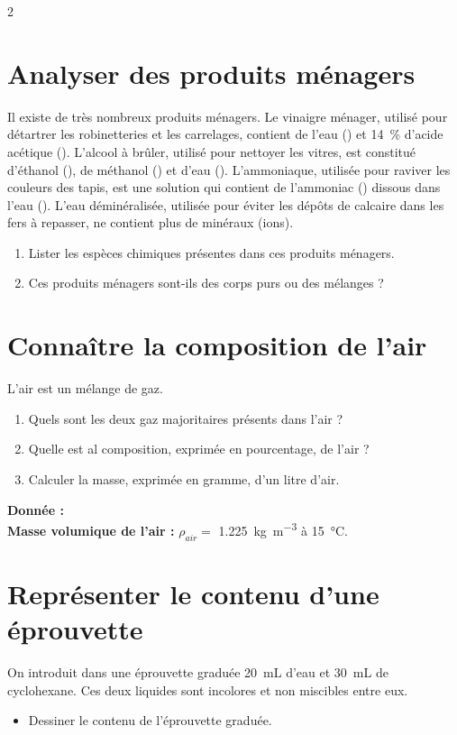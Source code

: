 \documentclass[a4paper,11pt,fleqn]{article}%
\begin{document}
\maketitle

\begin{multicols}{2}
\section{Analyser des produits ménagers}
Il existe de très nombreux produits ménagers. Le vinaigre ménager, utilisé pour détartrer les robinetteries et les carrelages, contient de l'eau () et \SI{14}{\percent} d'acide acétique (). L'alcool à brûler, utilisé pour nettoyer les vitres, est constitué d'éthanol (), de méthanol () et d'eau (). L'ammoniaque, utilisée pour raviver les couleurs des tapis, est une solution qui contient de l'ammoniac () dissous dans l'eau (). L'eau déminéralisée, utilisée pour éviter les dépôts de calcaire dans les fers à repasser, ne contient plus de minéraux (ions).
\begin{enumerate}
	\item Lister les espèces chimiques présentes dans ces produits ménagers.
	\item Ces produits ménagers sont-ils des corps purs ou des mélanges ?
\end{enumerate}

\section{Connaître la composition de l'air}
L'air est un mélange de gaz.
\begin{enumerate}
	\item Quels sont les deux gaz majoritaires présents dans l'air ?
	\item Quelle est al composition, exprimée en pourcentage, de l'air ?
	\item Calculer la masse, exprimée en gramme, d'un litre d'air.
\end{enumerate}

\textbf{Donnée :}\\
\textbf{Masse volumique de l'air :} $\rho_{air} =$ \SI{1,225}{\kilo\gram\per\meter\cubed} à \SI{15}{\celsius}.

\section{Représenter le contenu d'une éprouvette}
On introduit dans une éprouvette graduée \SI{20}{mL} d'eau et \SI{30}{mL} de cyclohexane. Ces deux liquides sont incolores et non miscibles entre eux.
\begin{itemize}
	\item Dessiner le contenu de l'éprouvette graduée.
\end{itemize}


\end{multicols}
\end{document}
